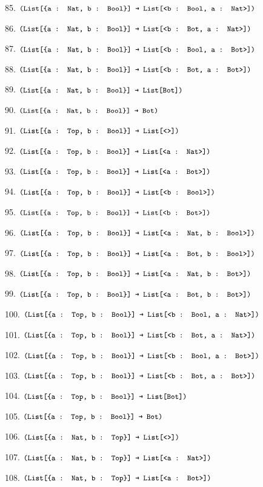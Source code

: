 \documentclass[dvipsnames]{article}
\let\codeOrig\code
\renewcommand{\code}[2][]{%
  \ifmmode
    \if\relax\detokenize{#1}\relax
      \mathchoice{\mbox{\normalfont\small\ttfamily #2}}{\mbox{\normalfont\small\ttfamily #2}}{\mbox{\normalfont\small\ttfamily #2}}{\mbox{\normalfont\small\ttfamily #2}}%
    \else
      \mathchoice{\mbox{\normalfont\small\ttfamily #2}}{\mbox{\normalfont\small\ttfamily #2}}{\mbox{\normalfont\small\ttfamily #2}}{\mbox{\normalfont\small\ttfamily #2}}%
    \fi
  \else
    \codeOrig[#1]{#2}%
  \fi}
\begin{document}
\begin{enumerate}
      85. $\code{(List[\{a : Nat, b : Bool\}] → List[<b : Bool, a : Nat>])}$

      86. $\code{(List[\{a : Nat, b : Bool\}] → List[<b : Bot, a : Nat>])}$

      87. $\code{(List[\{a : Nat, b : Bool\}] → List[<b : Bool, a : Bot>])}$

      88. $\code{(List[\{a : Nat, b : Bool\}] → List[<b : Bot, a : Bot>])}$

      89. $\code{(List[\{a : Nat, b : Bool\}] → List[Bot])}$

      90. $\code{(List[\{a : Nat, b : Bool\}] → Bot)}$

      91. $\code{(List[\{a : Top, b : Bool\}] → List[<>])}$

      92. $\code{(List[\{a : Top, b : Bool\}] → List[<a : Nat>])}$

      93. $\code{(List[\{a : Top, b : Bool\}] → List[<a : Bot>])}$

      94. $\code{(List[\{a : Top, b : Bool\}] → List[<b : Bool>])}$

      95. $\code{(List[\{a : Top, b : Bool\}] → List[<b : Bot>])}$

      96. $\code{(List[\{a : Top, b : Bool\}] → List[<a : Nat, b : Bool>])}$

      97. $\code{(List[\{a : Top, b : Bool\}] → List[<a : Bot, b : Bool>])}$

      98. $\code{(List[\{a : Top, b : Bool\}] → List[<a : Nat, b : Bot>])}$

      99. $\code{(List[\{a : Top, b : Bool\}] → List[<a : Bot, b : Bot>])}$

      100. $\code{(List[\{a : Top, b : Bool\}] → List[<b : Bool, a : Nat>])}$

      101. $\code{(List[\{a : Top, b : Bool\}] → List[<b : Bot, a : Nat>])}$

      102. $\code{(List[\{a : Top, b : Bool\}] → List[<b : Bool, a : Bot>])}$

      103. $\code{(List[\{a : Top, b : Bool\}] → List[<b : Bot, a : Bot>])}$

      104. $\code{(List[\{a : Top, b : Bool\}] → List[Bot])}$

      105. $\code{(List[\{a : Top, b : Bool\}] → Bot)}$

      106. $\code{(List[\{a : Nat, b : Top\}] → List[<>])}$

      107. $\code{(List[\{a : Nat, b : Top\}] → List[<a : Nat>])}$

      108. $\code{(List[\{a : Nat, b : Top\}] → List[<a : Bot>])}$


\end{enumerate}
\end{document}
